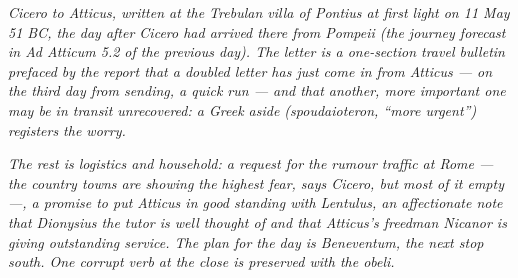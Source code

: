 
\textit{Cicero to Atticus, written at the Trebulan villa of Pontius
at first light on 11 May 51 BC, the day after Cicero had arrived
there from Pompeii (the journey forecast in Ad Atticum 5.2 of
the previous day). The letter is a one-section travel bulletin
prefaced by the report that a doubled letter has just come in
from Atticus --- on the third day from sending, a quick run ---
and that another, more important one may be in transit
unrecovered: a Greek aside (\textit{spoudaioteron}, ``more
urgent'') registers the worry.}

\textit{The rest is logistics and household: a request for the
rumour traffic at Rome --- the country towns are showing the
highest fear, says Cicero, but most of it empty ---, a promise
to put Atticus in good standing with Lentulus, an affectionate
note that Dionysius the tutor is well thought of and that
Atticus's freedman Nicanor is giving outstanding service. The
plan for the day is Beneventum, the next stop south. One
corrupt verb at the close is preserved with the obeli.}
